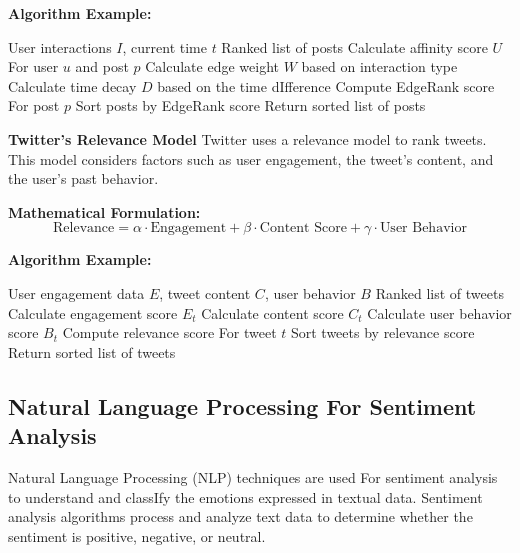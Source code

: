 \documentclass[12pt]{book} %
\begin{document}
\textbf{Algorithm Example:}
\FloatBarrier
\begin{algorithm}[H]
\caption{EdgeRank Algorithm}
\begin{algorithmic}[1]
\Require User interactions $I$, current time $t$
\Ensure Ranked list of posts
    \State Calculate affinity score $U$ For user $u$ and post $p$
    \State Calculate edge weight $W$ based on interaction type
    \State Calculate time decay $D$ based on the time dIfference
    \State Compute EdgeRank score For post $p$
\EndFor
\State Sort posts by EdgeRank score
\State Return sorted list of posts
\end{algorithmic}
\end{algorithm}
\FloatBarrier

\textbf{Twitter's Relevance Model}
Twitter uses a relevance model to rank tweets. This model considers factors such as user engagement, the tweet's content, and the user's past behavior.

\textbf{Mathematical Formulation:}
\begin{equation}
\text{Relevance} = \alpha \cdot \text{Engagement} + \beta \cdot \text{Content Score} + \gamma \cdot \text{User Behavior}
\end{equation}

\textbf{Algorithm Example:}
\FloatBarrier
\begin{algorithm}[H]
\caption{Twitter Relevance Model}
\begin{algorithmic}[1]
\Require User engagement data $E$, tweet content $C$, user behavior $B$
\Ensure Ranked list of tweets
    \State Calculate engagement score $E_t$
    \State Calculate content score $C_t$
    \State Calculate user behavior score $B_t$
    \State Compute relevance score For tweet $t$
\EndFor
\State Sort tweets by relevance score
\State Return sorted list of tweets
\end{algorithmic}
\end{algorithm}
\FloatBarrier

\subsection{Natural Language Processing For Sentiment Analysis}
Natural Language Processing (NLP) techniques are used For sentiment analysis to understand and classIfy the emotions expressed in textual data. Sentiment analysis algorithms process and analyze text data to determine whether the sentiment is positive, negative, or neutral.
\end{document}
